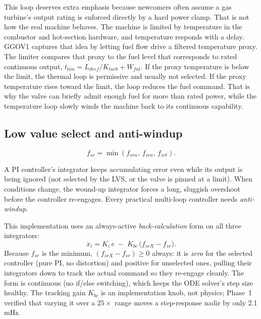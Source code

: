 \documentclass[11pt]{article}
\begin{document}
This loop deserves extra emphasis because newcomers often assume a gas
turbine's output rating is enforced directly by a hard power clamp. That
is not how the real machine behaves. The machine is limited by temperature
in the combustor and hot-section hardware, and temperature responds with a
delay. GGOV1 captures that idea by letting fuel flow drive a filtered
temperature proxy. The limiter compares that proxy to the fuel level that
corresponds to rated continuous output,
$t_{lim} = L_{dref}/K_{turb} + W_{fnl}$. If the proxy temperature is below
the limit, the thermal loop is permissive and usually not selected. If the
proxy temperature rises toward the limit, the loop reduces the fuel
command. That is why the valve can briefly admit enough fuel for more than
rated power, while the temperature loop slowly winds the machine back to
its continuous capability.

\subsection{Low value select and anti-windup}
\label{sec:aw}

\begin{equation}
  f_{sr} = \min\left(f_{srn},\, f_{sra},\, f_{srt}\right).
\end{equation}

\begin{novicebox}
A PI controller's integrator keeps accumulating error even while its
output is being ignored (not selected by the LVS, or the valve is pinned
at a limit). When conditions change, the wound-up integrator forces a
long, sluggish overshoot before the controller re-engages. Every
practical multi-loop controller needs \emph{anti-windup}.
\end{novicebox}

This implementation uses an always-active \emph{back-calculation} form on
all three integrators:
\begin{equation}
  \dot x_{i} = K_i\,e \;-\; K_{bc}\,\bigl(f_{srX} - f_{sr}\bigr).
  \label{eq:backcalc}
\end{equation}
Because $f_{sr}$ is the minimum, $(f_{srX} - f_{sr}) \ge 0$ always: it is
\emph{zero} for the selected controller (pure PI, no distortion) and
positive for unselected ones, pulling their integrators down to track the
actual command so they re-engage cleanly. The form is continuous (no
if/else switching), which keeps the ODE solver's step size healthy. The
tracking gain $K_{bc}$ is an implementation knob, not physics; Phase~1
verified that varying it over a $25\times$ range moves a step-response
nadir by only 2.1\,mHz.
\end{document}
